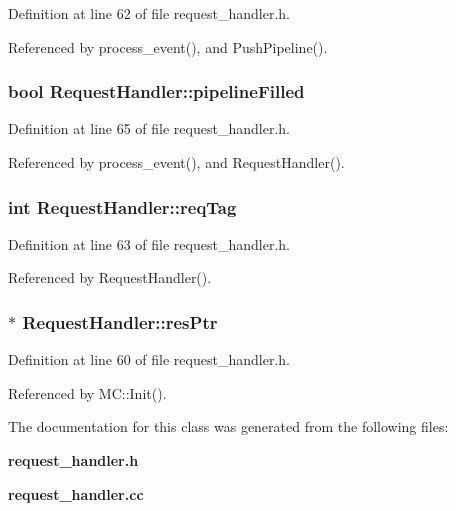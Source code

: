 Definition at line 62 of file request\_\-handler.h.

Referenced by process\_\-event(), and PushPipeline().
\subsubsection[{pipelineFilled}]{\setlength{\rightskip}{0pt plus 5cm}bool {\bf RequestHandler::pipelineFilled}}\label{classRequestHandler_50c874e27d09067976a7da4020c651a7}




Definition at line 65 of file request\_\-handler.h.

Referenced by process\_\-event(), and RequestHandler().
\subsubsection[{reqTag}]{\setlength{\rightskip}{0pt plus 5cm}int {\bf RequestHandler::reqTag}}\label{classRequestHandler_165285c7219bb2a76b9a4ba33c230e0d}




Definition at line 63 of file request\_\-handler.h.

Referenced by RequestHandler().
\subsubsection[{resPtr}]{$\ast$ {\bf RequestHandler::resPtr}}\label{classRequestHandler_5ea8057f932d231a2263d45be00489ea}




Definition at line 60 of file request\_\-handler.h.

Referenced by MC::Init().

The documentation for this class was generated from the following files:\begin{CompactItemize}
\item 
{\bf request\_\-handler.h}\item 
{\bf request\_\-handler.cc}\end{CompactItemize}
